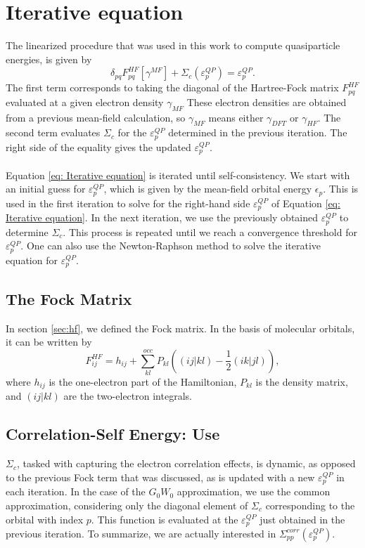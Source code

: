 \documentclass[12pt]{caltech_thesis}
\begin{document}
\section{Iterative equation}
The linearized procedure that was used in this work to compute quasiparticle energies, is given by
\begin{equation}
    \delta_{pq}F_{pq}^{HF}[\gamma^{MF}] + \Sigma _{c}(\varepsilon_{p}^{QP}) = \varepsilon_{p}^{QP}.
\label{eq: Iterative equation}
\end{equation}
The first term corresponds to taking the diagonal of the Hartree-Fock matrix $F_{pq}^{HF}$ evaluated at a given electron density $\gamma_{MF}$ These electron densities are obtained from a previous mean-field calculation, so $\gamma_{MF}$ means either $\gamma_{DFT}$ or $\gamma_{HF}$. The second term evaluates $\Sigma _{c}$ for the $\varepsilon_{p}^{QP}$ determined in the previous iteration. The right side of the equality gives the updated $\varepsilon_{p}^{QP}$.\\\\ Equation \ref{eq: Iterative equation} is iterated until self-consistency. We start with an initial guess for $\varepsilon_{p}^{QP}$, which is given by the mean-field orbital energy $\epsilon_p$. This is used in the first iteration to solve for the right-hand side $\varepsilon_{p}^{QP}$ of Equation \ref{eq: Iterative equation}. In the next iteration, we use the previously obtained $\varepsilon_{p}^{QP}$ to determine $\Sigma _{c}$. This process is repeated until we reach a convergence threshold for $\varepsilon_{p}^{QP}$. One can also use the Newton-Raphson method to solve the iterative equation for $\varepsilon_{p}^{QP}$.
\subsection{The Fock Matrix}
In section \ref{sec:hf}, we defined the Fock matrix. In the basis of molecular orbitals, it can be written by
\begin{equation}
    F_{ij}^{HF} = h_{ij} + \sum_{kl}^{occ} P_{kl} \left( (ij|kl) - \frac{1}{2} (ik|jl) \right),
\end{equation}
where $h_{ij}$ is the one-electron part of the Hamiltonian, $P_{kl}$ is the density matrix, and $(ij|kl)$ are the two-electron integrals.
\subsection{Correlation-Self Energy: Use}
$\Sigma _{c}$, tasked with capturing the electron correlation effects, is dynamic, as opposed to the previous Fock term that was discussed, as is updated with a new $\varepsilon_{p}^{QP}$ in each iteration. In the case of the $G_0W_0$ approximation, we use the common approximation, considering only the diagonal element of $\Sigma _{c}$ corresponding to the orbital with index $p$. This function is evaluated at the $\varepsilon_{p}^{QP}$ just obtained in the previous iteration. To summarize, we are actually interested in $\Sigma_{pp}^{corr}(\varepsilon_{p}^{QP})$. 
\end{document}
